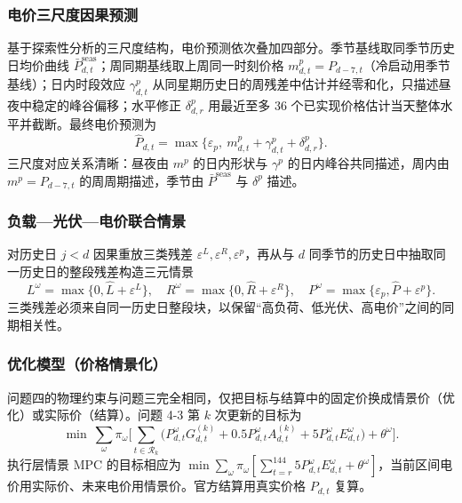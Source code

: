 \subsubsection{电价三尺度因果预测}

基于探索性分析的三尺度结构，电价预测依次叠加四部分。季节基线取同季节历史日均价曲线 $\bar P^{\mathrm{seas}}_{d,t}$；周同期基线取上周同一时刻价格 $m^p_{d,t}=P_{d-7,t}$（冷启动用季节基线）；日内时段效应 $\gamma^p_{d,t}$ 从同星期历史日的周残差中估计并经零和化，只描述昼夜中稳定的峰谷偏移；水平修正 $\delta^p_{d,r}$ 用最近至多 36 个已实现价格估计当天整体水平并截断。最终电价预测为
\begin{equation}
\widehat P_{d,t}=\max\Big\{\varepsilon_p,\ m^p_{d,t}+\gamma^p_{d,t}+\delta^p_{d,r}\Big\}.\label{eq:price4}
\end{equation}
三尺度对应关系清晰：昼夜由 $m^p$ 的日内形状与 $\gamma^p$ 的日内峰谷共同描述，周内由 $m^p=P_{d-7,t}$ 的周周期描述，季节由 $\bar P^{\mathrm{seas}}$ 与 $\delta^p$ 描述。

\subsubsection{负载—光伏—电价联合情景}

对历史日 $j<d$ 因果重放三类残差 $\varepsilon^L,\varepsilon^R,\varepsilon^p$，再从与 $d$ 同季节的历史日中抽取同一历史日的整段残差构造三元情景
\begin{equation}
L^\omega=\max\{0,\widehat L+\varepsilon^L\},\quad R^\omega=\max\{0,\widehat R+\varepsilon^R\},\quad P^\omega=\max\{\varepsilon_p,\widehat P+\varepsilon^p\}.\label{eq:scenario4}
\end{equation}
三类残差必须来自同一历史日整段块，以保留“高负荷、低光伏、高电价”之间的同期相关性。

\subsubsection{优化模型（价格情景化）}

问题四的物理约束与问题三完全相同，仅把目标与结算中的固定价换成情景价（优化）或实际价（结算）。问题 4-3 第 $k$ 次更新的目标为
\begin{equation}
\min\ \sum_{\omega}\pi_\omega\Big[\sum_{t\in\mathcal R_k}\big(P^\omega_{d,t}G^{(k)}_{d,t}+0.5P^\omega_{d,t}A^{(k)}_{d,t}+5P^\omega_{d,t}E^\omega_{d,t}\big)+\theta^\omega\Big].\label{eq:obj4}
\end{equation}
执行层情景 MPC 的目标相应为 $\min\sum_\omega\pi_\omega[\sum_{t=r}^{144}5P^\omega_{d,t}E^\omega_{d,t}+\theta^\omega]$，当前区间电价用实际价、未来电价用情景价。官方结算用真实价格 $P_{d,t}$ 复算。

